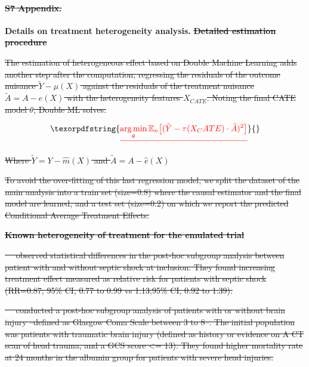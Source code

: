 \documentclass[10pt,letterpaper]{article}
\DeclareMathOperator*{\argmin}{arg\,min}
\providecommand{\DIFdeltex}[1]{{\protect\color{red}\sout{#1}}}                      %
\providecommand{\DIFdelbegin}{} %
\providecommand{\DIFdelend}{} %
\providecommand{\DIFdel}[1]{\texorpdfstring{\DIFdeltex{#1}}{}} %
\newcommand{\DIFscaledelfig}{0.5}
\newlength{\DIFdelgraphicswidth} %
\newlength{\DIFdelgraphicsheight} %
\newcommand{\DIFdelincludegraphics}[2][]{%
\sbox{\DIFdelgraphicsbox}{\DIFOincludegraphics[#1]{#2}}%
\settoboxwidth{\DIFdelgraphicswidth}{\DIFdelgraphicsbox} %
\settoboxtotalheight{\DIFdelgraphicsheight}{\DIFdelgraphicsbox} %
\scalebox{\DIFscaledelfig}{%
\parbox[b]{\DIFdelgraphicswidth}{\usebox{\DIFdelgraphicsbox}\\[-\baselineskip] \rule{\DIFdelgraphicswidth}{0em}}\llap{\resizebox{\DIFdelgraphicswidth}{\DIFdelgraphicsheight}{%
\setlength{\unitlength}{\DIFdelgraphicswidth}%
\begin{picture}(1,1)%
\thicklines\linethickness{2pt} %
{\color[rgb]{1,0,0}\put(0,0){\framebox(1,1){}}}%
{\color[rgb]{1,0,0}\put(0,0){\line( 1,1){1}}}%
{\color[rgb]{1,0,0}\put(0,1){\line(1,-1){1}}}%
\end{picture}%
}\hspace*{3pt}}} %
} %
\DeclareRobustCommand{\DIFdelbegin}{\DIFOdelbegin \let\includegraphics\DIFdelincludegraphics} %
\DeclareRobustCommand{\DIFdelend}{\DIFOaddend \let\includegraphics\DIFOincludegraphics} %
\begin{document}
\paragraph*{\DIFdel{S7 Appendix.}}
\DIFdelend \label{apd:hte}
{\bf Details on treatment heterogeneity analysis.}
\DIFdelbegin \textbf{\DIFdel{Detailed estimation procedure}}

\DIFdel{The estimation of heterogeneous effect based on Double Machine Learning adds
  another step after the computation, regressing the residuals of the outcome
  nuisance $\tilde{Y} - \mu(X)$ against the residuals of the treatment nuisance
  $\tilde{A} = A - e(X)$ with the heterogeneity features $X_{CATE}$. Noting the
  final CATE model $\theta$, Double ML solves:
}%

\begin{displaymath}\DIFdel{\argmin_{\theta} \mathbb E_n \big[(\tilde{Y} - \tau (X_CATE) \cdot \tilde{A})^2\big ]}\end{displaymath}%

\DIFdel{Where $\tilde{Y} = Y - \hat m(X)$ and $\tilde{A} = A - \hat e(X)$
}%

\DIFdel{To avoid the over-fitting of this last regression model, we split the dataset of
  the main analysis into a train set (size=0.8) where the causal estimator and the final
  model are learned, and a test set (size=0.2) on which we report the predicted Conditional Average
  Treatment Effects.
}%

\textbf{\DIFdel{Known heterogeneity of treatment for the emulated trial}}%

\DIFdel{\mbox{%
    \cite{caironi2014albumin} }\hskip0pt%
  observed statistical differences in the post-hoc
  subgroup analysis between patient with and without septic shock at inclusion.
  They found increasing treatment effect measured as relative risk for patients
  with septic shock (RR=0.87; 95\% CI, 0.77 to 0.99 vs 1.13;95\% CI, 0.92 to 1.39).
}%

\DIFdel{\mbox{%
    \cite{safe2007saline} }\hskip0pt%
  conducted a post-hoc subgroup analysis of patients with or
  without brain injury --defined as Glasgow Coma Scale between 3 to 8--. The
  initial population was patients with traumatic brain injury (defined as history
  or evidence on A CT scan of head trauma, and a GCS score <= 13). They found
  higher mortality rate at 24 months in the albumin group for patients with severe
  head injuries.
}%
\end{document}
